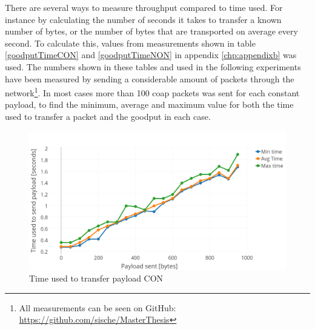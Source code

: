 

\noindent There are several ways to measure throughput compared to time used. For instance by calculating the number of seconds it takes to transfer a known number of bytes, or the number of bytes that are transported on average every second. To calculate this, values from measurements shown in table \ref{goodputTimeCON} and \ref{goodputTimeNON} in appendix \ref{chp:appendixb} was used. The numbers shown in these tables and used in the following experiments have been measured by sending a considerable amount of packets through the network\footnote{All measurements can be seen on GitHub: \url{https://github.com/sische/MasterThesis}}. In most cases more than 100 \gls{coap} packets was sent for each constant payload, to find the minimum, average and maximum value for both the time used to transfer a packet and the \gls{goodput} in each case. 

\begin{figure}[h!]
    \centering
    \includegraphics[width=1.0\textwidth]{bytesPrSecondNew3.png}    
    \caption{Time used to transfer payload CON}
    \label{fig:bytesPRSecond3}
\end{figure}


